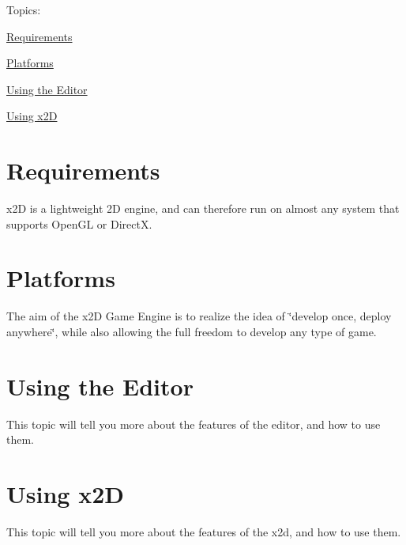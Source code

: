Topics\+:
\begin{DoxyItemize}
\item \hyperlink{require}{Requirements}
\item \hyperlink{platforms}{Platforms}
\item \hyperlink{using_editor}{Using the Editor}
\item \hyperlink{using_x2d}{Using x2\+D} 
\end{DoxyItemize}\hypertarget{require}{}\section{Requirements}\label{require}
x2\+D is a lightweight 2\+D engine, and can therefore run on almost any system that supports Open\+G\+L or Direct\+X. \hypertarget{platforms}{}\section{Platforms}\label{platforms}
The aim of the x2\+D Game Engine is to realize the idea of \char`\"{}develop once, deploy anywhere\char`\"{}, while also allowing the full freedom to develop any type of game. \hypertarget{using_editor}{}\section{Using the Editor}\label{using_editor}
This topic will tell you more about the features of the editor, and how to use them. \hypertarget{using_x2d}{}\section{Using x2\+D}\label{using_x2d}
This topic will tell you more about the features of the x2d, and how to use them. 